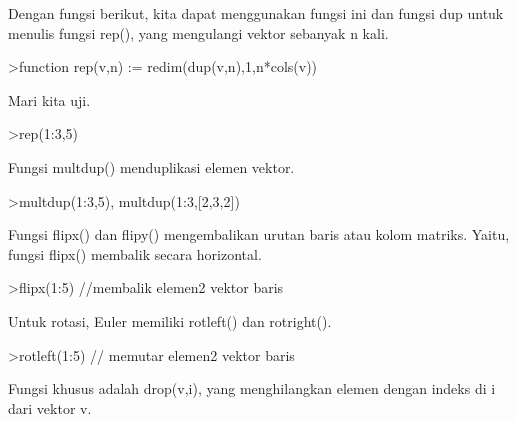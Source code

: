 \documentclass[a4paper,10pt]{article}
\begin{document}
\begin{eulernotebook}
\begin{eulercomment}
\begin{eulercomment}
\begin{eulercomment}
\begin{eulercomment}
\begin{eulercomment}
\begin{eulercomment}
\begin{eulercomment}
\begin{eulercomment}
\begin{eulercomment}
Dengan fungsi berikut, kita dapat menggunakan fungsi ini dan fungsi
dup untuk menulis fungsi rep(), yang mengulangi vektor sebanyak n
kali.
\end{eulercomment}
\begin{eulerprompt}
>function rep(v,n) := redim(dup(v,n),1,n*cols(v))
\end{eulerprompt}
\begin{eulercomment}
Mari kita uji.
\end{eulercomment}
\begin{eulerprompt}
>rep(1:3,5)
\end{eulerprompt}
\begin{euleroutput}
  [1,  2,  3,  1,  2,  3,  1,  2,  3,  1,  2,  3,  1,  2,  3]
\end{euleroutput}
\begin{eulercomment}
Fungsi multdup() menduplikasi elemen vektor.
\end{eulercomment}
\begin{eulerprompt}
>multdup(1:3,5), multdup(1:3,[2,3,2])
\end{eulerprompt}
\begin{euleroutput}
  [1,  1,  1,  1,  1,  2,  2,  2,  2,  2,  3,  3,  3,  3,  3]
  [1,  1,  2,  2,  2,  3,  3]
\end{euleroutput}
\begin{eulercomment}
Fungsi flipx() dan flipy() mengembalikan urutan baris atau kolom
matriks. Yaitu, fungsi flipx() membalik secara horizontal.
\end{eulercomment}
\begin{eulerprompt}
>flipx(1:5) //membalik elemen2 vektor baris
\end{eulerprompt}
\begin{euleroutput}
  [5,  4,  3,  2,  1]
\end{euleroutput}
\begin{eulercomment}
Untuk rotasi, Euler memiliki rotleft() dan rotright().
\end{eulercomment}
\begin{eulerprompt}
>rotleft(1:5) // memutar elemen2 vektor baris
\end{eulerprompt}
\begin{euleroutput}
  [2,  3,  4,  5,  1]
\end{euleroutput}
\begin{eulercomment}
Fungsi khusus adalah drop(v,i), yang menghilangkan elemen dengan
indeks di i dari vektor v.
\end{eulercomment}
\begin{eulerprompt}

\end{eulerprompt}
\end{eulercomment}
\end{eulercomment}
\end{eulercomment}
\end{eulercomment}
\end{eulercomment}
\end{eulercomment}
\end{eulercomment}
\end{eulercomment}
\end{eulernotebook}
\end{document}
